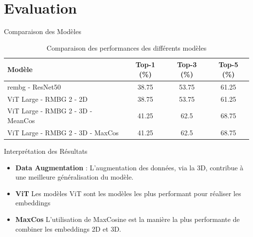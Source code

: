 \documentclass{beamer}
\begin{document}
\section{Evaluation}
\begin{frame}{Comparaison des Modèles}
    \begin{center}
        \begin{table}[]
            \centering
            \scriptsize %
            \begin{tabular}{|l|c|c|c|}
                \hline
                \textbf{Modèle} & \textbf{Top-1 (\%)} & \textbf{Top-3 (\%)} & \textbf{Top-5 (\%)} \\
                \hline
                rembg - ResNet50 & 38.75 & 53.75 & 61.25 \\
                \hline
                ViT Large - RMBG 2 - 2D & 38.75 & 53.75 & 61.25 \\
                \hline
                ViT Large - RMBG 2 - 3D - MeanCos & 41.25 & 62.5 & 68.75 \\
                \hline
                ViT Large - RMBG 2 - 3D - MaxCos & 41.25 & 62.5 & 68.75 \\
                \hline
            \end{tabular}
            \caption{Comparaison des performances des différents modèles}
        \end{table}
    \end{center}
    
    \begin{block}{Interprétation des Résultats}
        \begin{itemize}
            \item \textbf{Data Augmentation} : L'augmentation des données, via la 3D, contribue à une meilleure généralisation du modèle.
            \item \textbf{ViT} Les modèles ViT sont les modèles les plus performant pour réaliser les embeddings
            \item \textbf{MaxCos} L'utilisation de MaxCosine est la manière la plus performante de combiner les embeddings 2D et 3D.
        \end{itemize}
    \end{block}
\end{frame}
\end{document}
